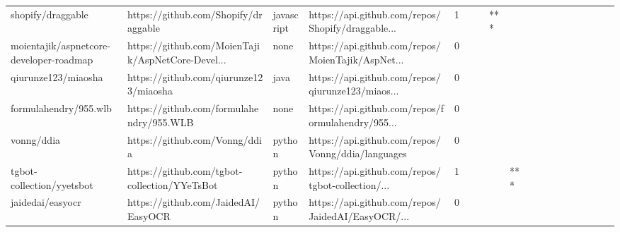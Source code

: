 \begin{tabular}{llllrlllllllllllll}
shopify/draggable                                  &               https://github.com/Shopify/draggable &        javascript &  https://api.github.com/repos/Shopify/draggable... &       1 &         &        &       *** &                &                 &        &           &           &          &          &       &              &          \\
moientajik/aspnetcore-developer-roadmap            &  https://github.com/MoienTajik/AspNetCore-Devel... &              none &  https://api.github.com/repos/MoienTajik/AspNet... &       0 &         &        &           &                &                 &        &           &           &          &          &       &              &          \\
qiurunze123/miaosha                                &             https://github.com/qiurunze123/miaosha &              java &  https://api.github.com/repos/qiurunze123/miaos... &       0 &         &        &           &                &                 &        &           &           &          &          &       &              &          \\
formulahendry/955.wlb                              &           https://github.com/formulahendry/955.WLB &              none &  https://api.github.com/repos/formulahendry/955... &       0 &         &        &           &                &                 &        &           &           &          &          &       &              &          \\
vonng/ddia                                         &                      https://github.com/Vonng/ddia &            python &  https://api.github.com/repos/Vonng/ddia/languages &       0 &         &        &           &                &                 &        &           &           &          &          &       &              &          \\
tgbot-collection/yyetsbot                          &       https://github.com/tgbot-collection/YYeTsBot &            python &  https://api.github.com/repos/tgbot-collection/... &       1 &         &        &           &            *** &                 &        &           &           &          &          &       &              &          \\
jaidedai/easyocr                                   &                https://github.com/JaidedAI/EasyOCR &            python &  https://api.github.com/repos/JaidedAI/EasyOCR/... &       0 &         &        &           &                &                 &        &           &           &          &          &       &              &          \\

\end{tabular}
